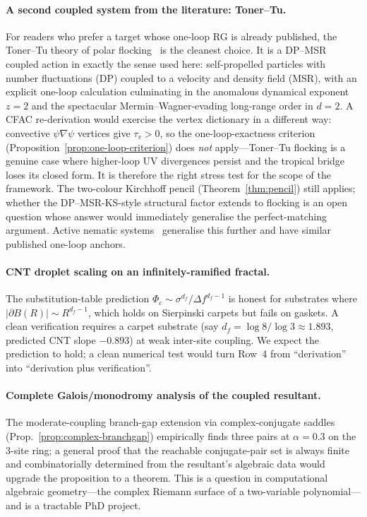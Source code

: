\documentclass[11pt,a4paper]{article}
\theoremstyle{plain}
\begin{document}
\paragraph{A second coupled system from the literature: Toner--Tu.}
For readers who prefer a target whose one-loop RG is already
published, the Toner--Tu theory of polar
flocking~\citep{TonerTu1995,TonerTu1998,Toner2012} is the
cleanest choice.  It is a DP--MSR coupled action in exactly the
sense used here: self-propelled particles with number
fluctuations (DP) coupled to a velocity and density field
(MSR), with an explicit one-loop calculation culminating in the
anomalous dynamical exponent $z = 2$ and the spectacular
Mermin--Wagner-evading long-range order in $d = 2$.  A CFAC
re-derivation would exercise the vertex dictionary in a
different way: convective $\psi \nabla \psi$ vertices give
$\tau_v > 0$, so the one-loop-exactness criterion
(Proposition~\ref{prop:one-loop-criterion}) does \emph{not}
apply---Toner--Tu flocking is a genuine case where higher-loop
UV divergences persist and the tropical bridge loses its closed
form.  It is therefore the right stress test for the scope of
the framework.  The two-colour Kirchhoff pencil
(Theorem~\ref{thm:pencil}) still applies; whether the
DP--MSR-KS-style structural factor extends to flocking is an
open question whose answer would immediately generalise the
perfect-matching argument.  Active nematic
systems~\citep{RamaswamySimhaToner2003,ChenToner2013} generalise
this further and have similar published one-loop anchors.

\paragraph{CNT droplet scaling on an infinitely-ramified fractal.}
The substitution-table prediction
$\Phi_c \sim \sigma^{d_f}/\Delta f^{d_f - 1}$ is honest for
substrates where $|\partial B(R)| \sim R^{d_f - 1}$, which holds
on Sierpinski carpets but fails on gaskets.  A clean
verification requires a carpet substrate (say $d_f = \log 8/\log
3 \approx 1.893$, predicted CNT slope $-0.893$) at weak
inter-site coupling.  We expect the prediction to hold; a clean
numerical test would turn Row~4 from ``derivation'' into
``derivation plus verification''.

\paragraph{Complete Galois/monodromy analysis of the coupled resultant.}
The moderate-coupling branch-gap extension via complex-conjugate
saddles
(Prop.~\ref{prop:complex-branchgap}) empirically finds three
pairs at $\alpha = 0.3$ on the 3-site ring; a general proof that
the reachable conjugate-pair set is always finite and
combinatorially determined from the resultant's algebraic data
would upgrade the proposition to a theorem.  This is a question
in computational algebraic geometry---the complex Riemann
surface of a two-variable polynomial---and is a tractable PhD
project.
\end{document}
